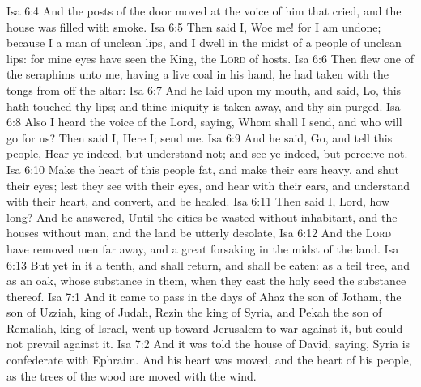 \vs Isa 6:4 And the posts of the door moved at the voice of him that cried, and the house was filled with smoke.
\vs Isa 6:5 Then said I, Woe  me! for I am undone; because I  a man of unclean lips, and I dwell in the midst of a people of unclean lips: for mine eyes have seen the King, the \textsc{Lord} of hosts.
\vs Isa 6:6 Then flew one of the seraphims unto me, having a live coal in his hand,  he had taken with the tongs from off the altar:
\vs Isa 6:7 And he laid  upon my mouth, and said, Lo, this hath touched thy lips; and thine iniquity is taken away, and thy sin purged.
\vs Isa 6:8 Also I heard the voice of the Lord, saying, Whom shall I send, and who will go for us? Then said I, Here  I; send me.
\vs Isa 6:9 And he said, Go, and tell this people, Hear ye indeed, but understand not; and see ye indeed, but perceive not.
\vs Isa 6:10 Make the heart of this people fat, and make their ears heavy, and shut their eyes; lest they see with their eyes, and hear with their ears, and understand with their heart, and convert, and be healed.
\vs Isa 6:11 Then said I, Lord, how long? And he answered, Until the cities be wasted without inhabitant, and the houses without man, and the land be utterly desolate,
\vs Isa 6:12 And the \textsc{Lord} have removed men far away, and  a great forsaking in the midst of the land.
\vs Isa 6:13 But yet in it  a tenth, and  shall return, and shall be eaten: as a teil tree, and as an oak, whose substance  in them, when they cast  the holy seed  the substance thereof.
\vs Isa 7:1 And it came to pass in the days of Ahaz the son of Jotham, the son of Uzziah, king of Judah,  Rezin the king of Syria, and Pekah the son of Remaliah, king of Israel, went up toward Jerusalem to war against it, but could not prevail against it.
\vs Isa 7:2 And it was told the house of David, saying, Syria is confederate with Ephraim. And his heart was moved, and the heart of his people, as the trees of the wood are moved with the wind.
